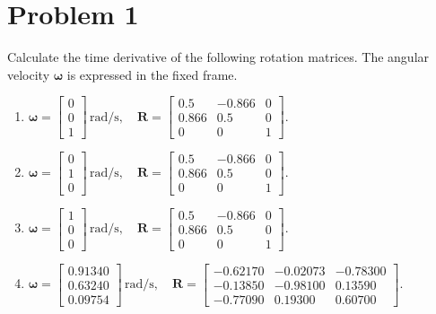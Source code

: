 \documentclass[11pt]{article}
\newcommand{\R}{\bm{R}}
\newcommand{\wvec}{\bm{\omega}}
\begin{document}
\section*{Problem 1}

\begin{statement}
Calculate the time derivative of the following rotation matrices. The angular velocity $\wvec$ is expressed in the fixed frame.
\begin{enumerate}[label=(\alph*), nosep]
\item $\wvec=\begin{bmatrix}0\\0\\1\end{bmatrix}\,\mathrm{rad/s},\quad \R=\begin{bmatrix}0.5&-0.866&0\\0.866&0.5&0\\0&0&1\end{bmatrix}.$
\item $\wvec=\begin{bmatrix}0\\1\\0\end{bmatrix}\,\mathrm{rad/s},\quad \R=\begin{bmatrix}0.5&-0.866&0\\0.866&0.5&0\\0&0&1\end{bmatrix}.$
\item $\wvec=\begin{bmatrix}1\\0\\0\end{bmatrix}\,\mathrm{rad/s},\quad \R=\begin{bmatrix}0.5&-0.866&0\\0.866&0.5&0\\0&0&1\end{bmatrix}.$
\item $\wvec=\begin{bmatrix}0.91340\\0.63240\\0.09754\end{bmatrix}\,\mathrm{rad/s},\quad \R=\begin{bmatrix}-0.62170&-0.02073&-0.78300\\-0.13850&-0.98100&0.13590\\-0.77090&0.19300&0.60700\end{bmatrix}.$
\end{enumerate}
\end{statement}
\end{document}
